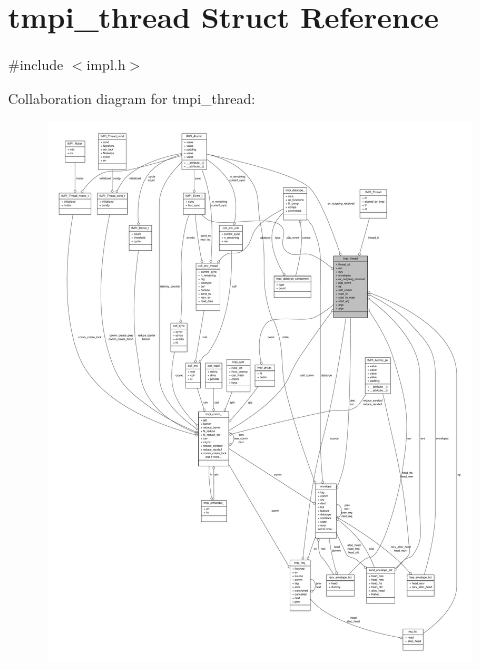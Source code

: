 \hypertarget{structtmpi__thread}{\section{tmpi\-\_\-thread \-Struct \-Reference}
\label{structtmpi__thread}
}


{\ttfamily \#include $<$impl.\-h$>$}



\-Collaboration diagram for tmpi\-\_\-thread\-:
\nopagebreak
\begin{figure}[H]
\begin{center}
\leavevmode
\includegraphics[width=350pt]{structtmpi__thread__coll__graph}
\end{center}
\end{figure}
